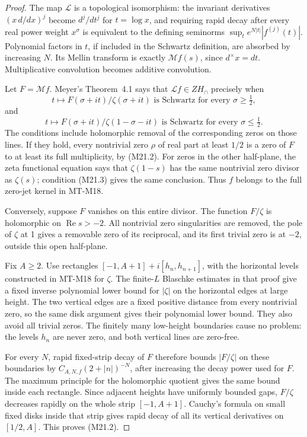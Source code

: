 \documentclass[11pt,a4paper]{article}
\begin{document}
\begin{proof}
The map \(\mathcal L\) is a topological isomorphism:
the invariant derivatives \((x\,d/dx)^j\) become
\(d^j/dt^j\) for \(t=\log x\), and requiring rapid
decay after every real power weight \(x^\sigma\)
is equivalent to the defining seminorms
\(\sup_t e^{N|t|}|f^{(j)}(t)|\). Polynomial factors in
\(t\), if included in the Schwartz definition, are
absorbed by increasing \(N\). Its Mellin transform is
exactly \(\mathcal Mf(s)\), since \(d^\times x=dt\).
Multiplicative convolution becomes additive convolution.

Let \(F=\mathcal Mf\). Meyer's Theorem~4.1 says that
\(\mathcal Lf\in ZH_\cap\) precisely when
\[
 t\longmapsto F(\sigma+it)/\zeta(\sigma+it)
          \text{ is Schwartz for every }\sigma\ge\tfrac12,
                                                               \tag{M21.2}
\]
and
\[
 t\longmapsto F(\sigma+it)/\zeta(1-\sigma-it)
          \text{ is Schwartz for every }\sigma\le\tfrac12.
                                                               \tag{M21.3}
\]
The conditions include holomorphic removal of the corresponding
zeros on those lines. If they hold, every nontrivial zero
\(\rho\) of real part at least \(1/2\) is a zero of \(F\)
to at least its full multiplicity, by (M21.2). For zeros in
the other half-plane, the zeta functional equation says that
\(\zeta(1-s)\) has the same nontrivial zero divisor as
\(\zeta(s)\); condition (M21.3) gives the same conclusion.
Thus \(f\) belongs to the full zero-jet kernel in MT-M18.

Conversely, suppose \(F\) vanishes on this entire divisor.
The function \(F/\zeta\) is holomorphic on
\(\operatorname{Re}s>-2\). All nontrivial zero singularities
are removed, the pole of \(\zeta\) at 1 gives a removable
zero of its reciprocal, and its first trivial zero is at
\(-2\), outside this open half-plane.

Fix \(A\ge2\). Use rectangles
\([-1,A+1]+i[h_n,h_{n+1}]\), with the horizontal levels
constructed in MT-M18 for \(\zeta\). The finite-\(L\)
Blaschke estimates in that proof give a fixed inverse
polynomial lower bound for \(|\zeta|\) on the horizontal
edges at large height. The two vertical edges are a fixed
positive distance from every nontrivial zero, so the same
disk argument gives their polynomial lower bound. They
also avoid all trivial zeros. The finitely many low-height
boundaries cause no problem: the levels \(h_n\) are never
zero, and both vertical lines are zero-free.

For every \(N\), rapid fixed-strip decay of \(F\)
therefore bounds \(|F/\zeta|\) on these boundaries by
\(C_{A,N,f}(2+|n|)^{-N}\), after increasing the decay
power used for \(F\). The maximum principle for the
holomorphic quotient gives the same bound inside each
rectangle. Since adjacent heights have uniformly bounded
gaps, \(F/\zeta\) decreases rapidly on the whole strip
\([-1,A+1]\). Cauchy's formula on small fixed disks
inside that strip gives rapid decay of all its vertical
derivatives on \([1/2,A]\). This proves (M21.2).


\end{proof}
\end{document}
